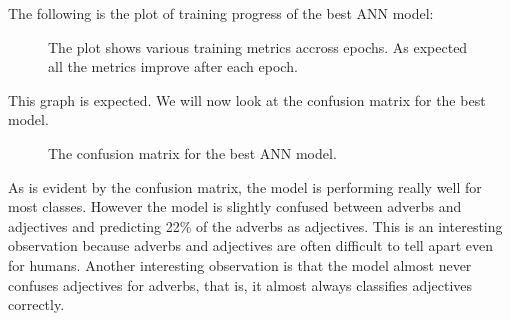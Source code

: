 \documentclass[a4paper,9pt]{report}
\begin{document}
The following is the plot of training progress of the best ANN model:
\begin{figure}[H]
    \centering
    \caption*{The plot shows various training metrics accross epochs. As expected all the metrics improve after each epoch.}
\end{figure}
This graph is expected. 
We will now look at the confusion matrix for the best model.
\begin{figure}[H]
    \centering
    \caption*{The confusion matrix for the best ANN model.}
\end{figure}
As is evident by the confusion matrix, the model is performing really well for most classes. However the model is slightly confused between adverbs and adjectives and predicting 22\% of the adverbs as adjectives. This is an interesting observation because adverbs and adjectives are often difficult to tell apart even for humans. Another interesting observation is that the model almost never confuses adjectives for adverbs, that is, it almost always classifies adjectives correctly.
\end{document}
